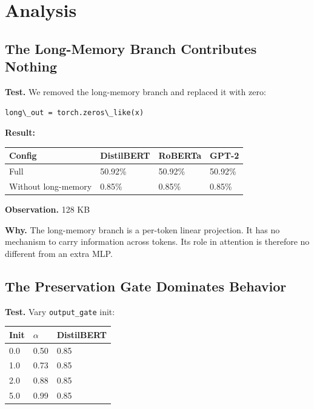 
\section{Analysis}

\subsection{The Long-Memory Branch Contributes Nothing}

\textbf{Test.} We removed the long-memory branch and replaced it with zero:

\begin{lstlisting}
long\_out = torch.zeros\_like(x)
\end{lstlisting}

\textbf{Result:}

\begin{table}[H]
\centering
\small
\begin{tabular}{llll}
\toprule
\textbf{Config} & \textbf{DistilBERT} & \textbf{RoBERTa} & \textbf{GPT-2} \\
\midrule
Full & 50.92\% & 50.92\% & 50.92\% \\
Without long-memory & 0.85\% & 0.85\% & 0.85\% \\
\bottomrule
\end{tabular}
\end{table}

\textbf{Observation.} 128 KB

\textbf{Why.} The long-memory branch is a per-token linear projection. It has no 
mechanism to carry information across tokens. Its role in attention is 
therefore no different from an extra MLP.

\subsection{The Preservation Gate Dominates Behavior}

\textbf{Test.} Vary \texttt{output\_gate} init:

\begin{table}[H]
\centering
\small
\begin{tabular}{lll}
\toprule
\textbf{Init} & \textbf{$\alpha$} & \textbf{DistilBERT} \\
\midrule
0.0 & 0.50 & 0.85 \\
1.0 & 0.73 & 0.85 \\
2.0 & 0.88 & 0.85 \\
5.0 & 0.99 & 0.85 \\
\bottomrule
\end{tabular}
\end{table}

